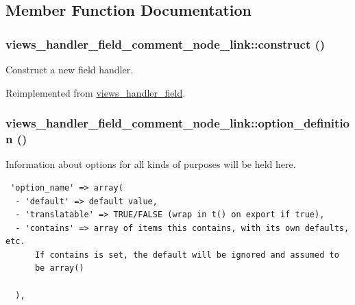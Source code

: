 \subsection{Member Function Documentation}
\hypertarget{classviews__handler__field__comment__node__link_6a8823310c2ef5c3a70e6a394e45e699}{
\subsubsection[{construct}]{\setlength{\rightskip}{0pt plus 5cm}views\_\-handler\_\-field\_\-comment\_\-node\_\-link::construct ()}}
\label{classviews__handler__field__comment__node__link_6a8823310c2ef5c3a70e6a394e45e699}


Construct a new field handler. 

Reimplemented from \hyperlink{classviews__handler__field_3d50050864c255b71c842972a45d39f6}{views\_\-handler\_\-field}.\hypertarget{classviews__handler__field__comment__node__link_b4da7290cf0b97776fcc70c4f799e567}{
\subsubsection[{option\_\-definition}]{\setlength{\rightskip}{0pt plus 5cm}views\_\-handler\_\-field\_\-comment\_\-node\_\-link::option\_\-definition ()}}
\label{classviews__handler__field__comment__node__link_b4da7290cf0b97776fcc70c4f799e567}


Information about options for all kinds of purposes will be held here. 

\begin{Code}\begin{verbatim} 'option_name' => array(
  - 'default' => default value,
  - 'translatable' => TRUE/FALSE (wrap in t() on export if true),
  - 'contains' => array of items this contains, with its own defaults, etc.
      If contains is set, the default will be ignored and assumed to
      be array()

  ),
\end{verbatim}
\end{Code}

